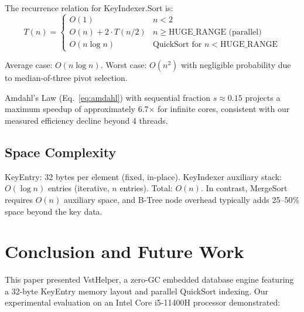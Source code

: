 \documentclass[conference]{IEEEtran}
\begin{document}
The recurrence relation for KeyIndexer.Sort is:
\begin{equation}
T(n) =
\begin{cases}
    O(1) & n < 2 \\
    O(n) + 2 \cdot T(n/2) & n \geq \text{HUGE\_RANGE (parallel)} \\
    O(n \log n) & \text{QuickSort for } n < \text{HUGE\_RANGE}
\end{cases}
\end{equation}

Average case: $O(n \log n)$. Worst case: $O(n^2)$ with negligible probability due to median-of-three pivot selection.

Amdahl's Law (Eq.~\ref{eq:amdahl}) with sequential fraction $s \approx 0.15$ projects a maximum speedup of approximately 6.7$\times$ for infinite cores, consistent with our measured efficiency decline beyond 4 threads.

\subsection{Space Complexity}
\label{sec:space_complexity}

KeyEntry: 32 bytes per element (fixed, in-place). KeyIndexer auxiliary stack: $O(\log n)$ entries (iterative, $n$ entries). Total: $O(n)$. In contrast, MergeSort requires $O(n)$ auxiliary space, and B-Tree node overhead typically adds 25--50\% space beyond the key data.

\section{Conclusion and Future Work}
\label{sec:conclusion}

This paper presented VstHelper, a zero-GC embedded database engine featuring a 32-byte KeyEntry memory layout and parallel QuickSort indexing. Our experimental evaluation on an Intel Core i5-11400H processor demonstrated:
\end{document}
